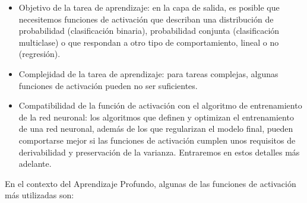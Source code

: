 \begin{itemize}
    \item Objetivo de la tarea de aprendizaje: en la capa de salida, es posible que necesitemos funciones de activación que describan una distribución de probabilidad (clasificación binaria), probabilidad conjunta (clasificación multiclase) o que respondan a otro tipo de comportamiento, lineal o no (regresión).
    \item Complejidad de la tarea de aprendizaje: para tareas complejas, algunas funciones de activación pueden no ser suficientes.
    \item Compatibilidad de la función de activación con el algoritmo de entrenamiento de la red neuronal: los algoritmos que definen y  optimizan el entrenamiento de una red neuronal, además de los que regularizan el modelo final, pueden comportarse mejor si las funciones de activación cumplen unos requisitos de derivabilidad y preservación de la varianza. Entraremos en estos detalles más adelante. 
\end{itemize}
En el contexto del Aprendizaje Profundo, algunas de las funciones de activación más utilizadas son: 
